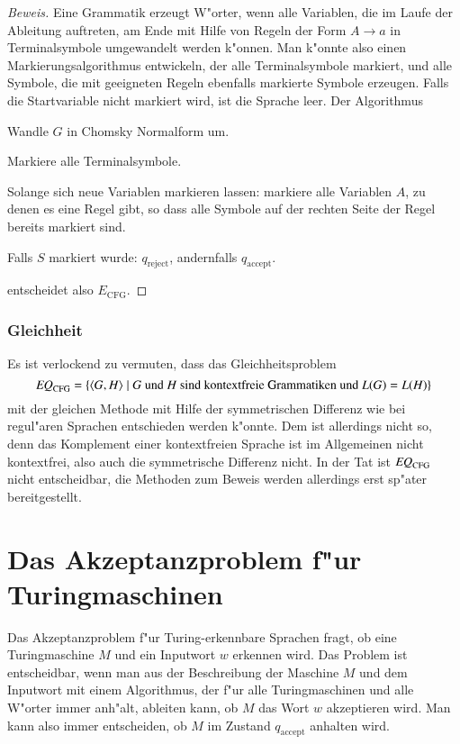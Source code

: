 \begin{proof}[Beweis]
Eine Grammatik erzeugt W"orter, wenn alle Variablen, die im Laufe
der Ableitung auftreten, am Ende mit Hilfe von Regeln der Form $A\to a$
in Terminalsymbole umgewandelt werden k"onnen. Man k"onnte also einen
Markierungsalgorithmus entwickeln, der alle Terminalsymbole markiert,
und alle Symbole, die mit geeigneten Regeln ebenfalls markierte Symbole
erzeugen. Falls die Startvariable nicht markiert wird, ist die Sprache
leer. Der Algorithmus 
\medskip
\begin{compactenum}
\item Wandle $G$ in Chomsky Normalform um.
\item Markiere alle Terminalsymbole.
\item Solange sich neue Variablen markieren lassen: markiere alle
Variablen $A$, zu denen es eine Regel gibt, so dass alle Symbole auf
der rechten Seite der Regel bereits markiert sind.
\item Falls $S$ markiert wurde: $q_{\text{reject}}$, andernfalls
$q_{\text{accept}}$.
\end{compactenum}
\medskip
entscheidet also
$E_{\text{CFG}}$.
\end{proof}

\subsubsection{Gleichheit}
Es ist verlockend zu vermuten, dass das Gleichheitsproblem
\[
\text{\it EQ}_{\text{CFG}}=\{
\langle G,H\rangle\;|\; \text{$G$  und $H$ sind kontextfreie Grammatiken und $L(G)=L(H)$}
\}
\]
mit der gleichen Methode mit Hilfe der symmetrischen Differenz
wie bei regul"aren Sprachen entschieden werden k"onnte. Dem ist
allerdings nicht so, denn das Komplement einer kontextfreien Sprache
ist im Allgemeinen nicht kontextfrei, also auch die symmetrische
Differenz nicht. In der Tat ist 
$\text{\it EQ}_{\text{CFG}}$ nicht entscheidbar, die Methoden zum Beweis
werden allerdings erst sp"ater bereitgestellt.

\section{Das Akzeptanzproblem f"ur Turingmaschinen}
Das Akzeptanzproblem f"ur Turing-erkennbare Sprachen fragt, ob 
eine Turingmaschine $M$ und ein Inputwort $w$ erkennen wird.
Das Problem ist entscheidbar, wenn man aus der Beschreibung
der Maschine $M$ und dem Inputwort mit einem Algorithmus, der
f"ur alle Turingmaschinen und alle W"orter immer anh"alt, ableiten
kann, ob $M$ das Wort $w$ akzeptieren wird. Man kann also immer
entscheiden, ob $M$ im Zustand $q_{\text{accept}}$ anhalten wird.

